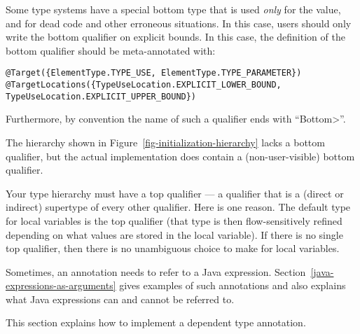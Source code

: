 
Some type systems have a special bottom type that is used \emph{only} for
the  value, and for dead code and other erroneous situations.
In this case, users should only write the bottom qualifier on explicit
bounds.  In this case, the definition of the bottom qualifier should be
meta-annotated with:

%
\begin{Verbatim}
@Target({ElementType.TYPE_USE, ElementType.TYPE_PARAMETER})
@TargetLocations({TypeUseLocation.EXPLICIT_LOWER_BOUND, TypeUseLocation.EXPLICIT_UPPER_BOUND})
\end{Verbatim}

Furthermore, by convention the name of such a qualifier ends with ``\<Bottom>''.

The hierarchy shown in Figure~\ref{fig-initialization-hierarchy} lacks
a bottom qualifier, but the actual implementation does contain a (non-user-visible) bottom qualifier.


Your type hierarchy must have a top qualifier
--- a qualifier that is a (direct or indirect) supertype of every other
qualifier.
Here is one reason.
The default type for local variables is the top
qualifier (that type is then flow-sensitively
refined depending on what values are stored in the local variable).
If there is no single top qualifier, then there is no
unambiguous choice to make for local variables.



Sometimes, an annotation needs to refer to a Java expression.
Section~\ref{java-expressions-as-arguments} gives examples of such
annotations and also explains what Java expressions can and cannot be
referred to.

This section explains how to implement a dependent type annotation.

